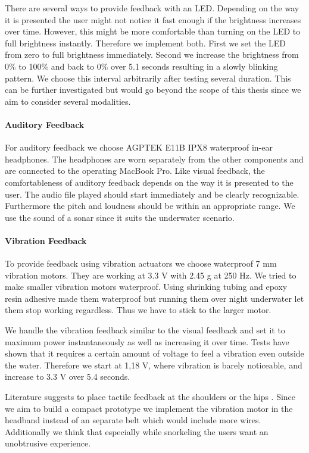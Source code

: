 There are several ways to provide feedback with an LED.
Depending on the way it is presented the user might not notice it fast enough if the brightness increases over time.
However, this might be more comfortable than turning on the LED to full brightness instantly.
Therefore we implement both.
First we set the LED from zero to full brightness immediately.
Second we increase the brightness from 0\% to 100\%  and back to 0\% over 5.1 seconds resulting in a slowly blinking pattern.
We choose this interval arbitrarily after testing several duration.
This can be further investigated but would go beyond the scope of this thesis since we aim to consider several modalities.


\paragraph{Auditory Feedback}

For auditory feedback we choose AGPTEK E11B IPX8 waterproof in-ear headphones.
The headphones are worn separately from the other components and are connected to the operating MacBook Pro.
Like visual feedback, the comfortableness of auditory feedback depends on the way it is presented to the user. 
The audio file played should start immediately and be clearly recognizable.
Furthermore the pitch and loudness should be within an appropriate range.
We use the sound of a sonar since it suits the underwater scenario.


\paragraph{Vibration Feedback}

To provide feedback using vibration actuators we choose waterproof 7 mm vibration motors.
They are working at 3.3 V with 2.45 g at 250 Hz.
We tried to make smaller vibration motors waterproof.
Using shrinking tubing and epoxy resin adhesive made them waterproof but running them over night underwater let them stop working regardless.
Thus we have to stick to the larger motor.

We handle the vibration feedback similar to the visual feedback and set it to maximum power instantaneously as well as increasing it over time.
Tests have shown that it requires a certain amount of voltage to feel a vibration even outside the water.
Therefore we start at 1,18 V, where vibration is barely noticeable, and increase to 3.3 V over 5.4 seconds.

Literature suggests to place tactile feedback at the shoulders or the hips \citep{Kiss:2018:NSM:3173574.3174191}.
Since we aim to build a compact prototype we implement the vibration motor in the headband instead of an separate belt which would include more wires.
Additionally we think that especially while snorkeling the users want an unobtrusive experience.


